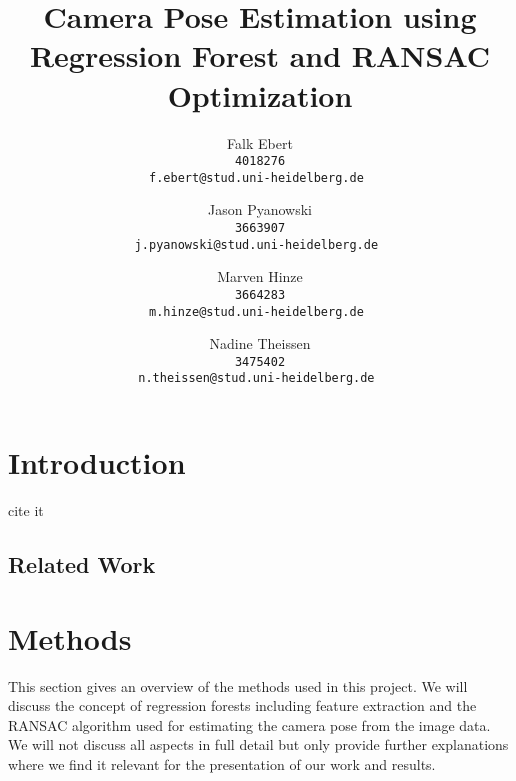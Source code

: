 \documentclass[final]{cvpr}
\begin{document}
\title{Camera Pose Estimation using Regression Forest and RANSAC Optimization}

\author{Falk Ebert\\
\tt 4018276\\
{\tt\small f.ebert@stud.uni-heidelberg.de}
\and
Jason Pyanowski\\
\tt 3663907\\
{\tt\small j.pyanowski@stud.uni-heidelberg.de}
\and
Marven Hinze\\
\tt 3664283\\
{\tt\small m.hinze@stud.uni-heidelberg.de}
\and
Nadine Theissen\\
\tt 3475402\\
{\tt\small n.theissen@stud.uni-heidelberg.de}
}

\maketitle


\begin{abstract}
   
\end{abstract}

\section{Introduction}
cite it~\cite{shotton2013}



\subsection{Related Work}


\section{Methods}
This section gives an overview of the methods used in this project. We will discuss
the concept of regression forests including feature extraction and the RANSAC algorithm
used for estimating the camera pose from the image data. We will not discuss all aspects
in full detail but only provide further explanations where we find it relevant
for the presentation of our work and results.
\end{document}
